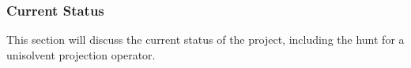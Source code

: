 \subsubsection{Current Status}

This section will discuss the current status of the project, including the
hunt for a unisolvent projection operator.

